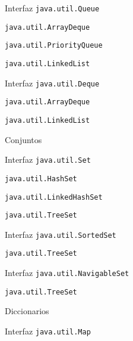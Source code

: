 \begin{longenum}
\begin{longenum}
        \begin{longenum}
            \item Interfaz \texttt{java.util.Queue}
            \begin{longenum}
                \item \texttt{java.util.ArrayDeque}
                \item \texttt{java.util.PriorityQueue}
                \item \texttt{java.util.LinkedList}
            \end{longenum}
            \item Interfaz \texttt{java.util.Deque}
            \begin{longenum}
                \item \texttt{java.util.ArrayDeque}
                \item \texttt{java.util.LinkedList}
            \end{longenum}
        \end{longenum}
        \item Conjuntos
        \begin{longenum}
            \item Interfaz \texttt{java.util.Set}
            \begin{longenum}
                \item \texttt{java.util.HashSet}
                \item \texttt{java.util.LinkedHashSet}
                \item \texttt{java.util.TreeSet}
            \end{longenum}
            \item Interfaz \texttt{java.util.SortedSet}
            \begin{longenum}
                \item \texttt{java.util.TreeSet}
            \end{longenum}
            \item Interfaz \texttt{java.util.NavigableSet}
            \begin{longenum}
                \item \texttt{java.util.TreeSet}
            \end{longenum}
        \end{longenum}
        \item Diccionarios
        \begin{longenum}
            \item Interfaz \texttt{java.util.Map}

\end{longenum}
\end{longenum}
\end{longenum}
